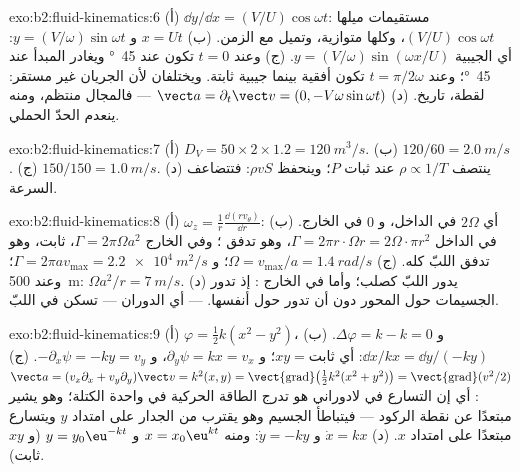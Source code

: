 \begin{solution}{exo:b2:fluid-kinematics:6}
(أ) $\dd y/\dd x = (V/U)\cos\omega t$: مستقيمات ميلها
$(V/U)\cos\omega t$، وكلها متوازية، وتميل مع الزمن. (ب) $x = Ut$ و $y =
(V/\omega)\sin\omega t$: أي الجيبية $y = (V/\omega)\sin(\omega x/U)$. (ج) وعند
$t = 0$ تكون  عند \qty{45}{\degree} ويغادر 
المبدأ عند \qty{45}{\degree}؛ وعند $t = \pi/2\omega$ تكون 
أفقية بينما  جيبية ثابتة. ويختلفان لأن الجريان غير
مستقر:  لقطة،  تاريخ.
(د) $\vect a = \partial_t\vect v = (0, -V\omega\sin\omega t)$ --- فالمجال
منتظم، ومنه ينعدم الحدّ الحملي.
\end{solution}

\begin{solution}{exo:b2:fluid-kinematics:7}
(أ) $D_V = 50 \times 2 \times 1.2 = \qty{120}{m^3/s}$. (ب) $120/60 = \qty{2.0}{m/s}$.
(ج) $150/150 = \qty{1.0}{m/s}$. (د) ينتصف $\rho \propto 1/T$ عند ثبات $P$؛
وينحفظ $\rho vS$: فتتضاعف السرعة.
\end{solution}

\begin{solution}{exo:b2:fluid-kinematics:8}
(أ) $\omega_z = \frac1r\frac{\dd(rv_\theta)}{\dd r}$: أي $2\Omega$ في الداخل، و $0$
في الخارج. (ب) في الداخل $\Gamma = 2\pi r\cdot\Omega r = 2\Omega\cdot\pi r^2$، وهو تدفق
؛ وفي الخارج $\Gamma = 2\pi\Omega a^2$، ثابت، وهو تدفق
اللبّ كله. (ج) $\Omega = v_{\max}/a = \qty{1.4}{rad/s}$؛ و $\Gamma = 2\pi av_{\max}
= \qty{2.2e4}{m^2/s}$؛ وعند \qty{500}{m}: $\Omega a^2/r = \qty{7}{m/s}$. (د) يدور
اللبّ كصلب؛ وأما في الخارج : إذ تدور الجسيمات
حول المحور دون أن تدور حول أنفسها.  --- أي الدوران ---
تسكن في اللبّ.
\end{solution}

\begin{solution}{exo:b2:fluid-kinematics:9}
(أ) $\varphi = \tfrac12k(x^2 - y^2)$، و $\Delta\varphi = k - k = 0$. (ب) $\dd x/
kx = \dd y/(-ky)$: أي $xy = \text{ثابت}$؛ و $\partial_y\psi = kx = v_x$، و $-\partial_x\psi =
-ky = v_y$. (ج) $\vect a = (v_x\partial_x + v_y\partial_y)\vect v = k^2(x, y) =
\operatorname{\vect{grad}}\bigl(\tfrac12k^2(x^2 + y^2)\bigr) = \operatorname{\vect{grad}}
(v^2/2)$: أي إن التسارع في  لادوراني هو تدرج الطاقة
الحركية في واحدة الكتلة؛ وهو يشير مبتعدًا عن نقطة الركود ---
فيتباطأ الجسيم وهو يقترب من الجدار على امتداد $y$ ويتسارع مبتعدًا على امتداد $x$.
(د) $\dot x = kx$ و $\dot y = -ky$: ومنه
$x = x_0\eu^{kt}$ و $y = y_0\eu^{-kt}$ (و $xy$ ثابت).
\end{solution}

